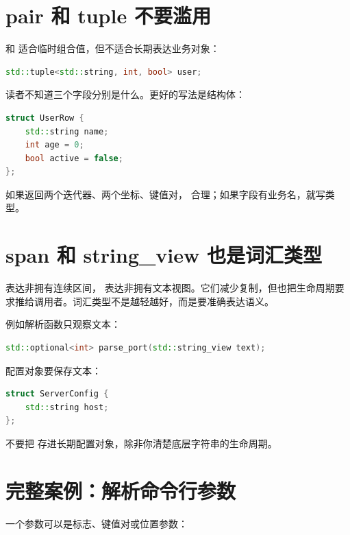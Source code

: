 \section{pair 和 tuple 不要滥用}

 和  适合临时组合值，但不适合长期表达业务对象：

\begin{lstlisting}[language=C++,caption={tuple 让含义消失}]
std::tuple<std::string, int, bool> user;
\end{lstlisting}

读者不知道三个字段分别是什么。更好的写法是结构体：

\begin{lstlisting}[language=C++,caption={结构体保留字段含义}]
struct UserRow {
    std::string name;
    int age = 0;
    bool active = false;
};
\end{lstlisting}

如果返回两个迭代器、两个坐标、键值对， 合理；如果字段有业务名，就写类型。

\section{span 和 string\_view 也是词汇类型}

 表达非拥有连续区间， 表达非拥有文本视图。它们减少复制，但也把生命周期要求推给调用者。词汇类型不是越轻越好，而是要准确表达语义。

例如解析函数只观察文本：

\begin{lstlisting}[language=C++,caption={解析只需要观察文本}]
std::optional<int> parse_port(std::string_view text);
\end{lstlisting}

配置对象要保存文本：

\begin{lstlisting}[language=C++,caption={保存文本要拥有字符串}]
struct ServerConfig {
    std::string host;
};
\end{lstlisting}

不要把  存进长期配置对象，除非你清楚底层字符串的生命周期。

\section{完整案例：解析命令行参数}

一个参数可以是标志、键值对或位置参数：

